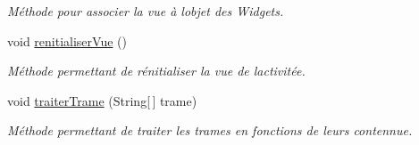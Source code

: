 \begin{DoxyCompactItemize}
\begin{DoxyCompactList}\small\item\em Méthode pour associer la vue à l\textquotesingle{}objet des Widgets. \end{DoxyCompactList}\item 
void \hyperlink{classcom_1_1lasalle_1_1io__trucks_1_1_main_activity_ac4c0bdaf761a42e924c6cf9d1b9a0e23}{renitialiser\+Vue} ()
\begin{DoxyCompactList}\small\item\em Méthode permettant de rénitialiser la vue de l\textquotesingle{}activitée. \end{DoxyCompactList}\item 
void \hyperlink{classcom_1_1lasalle_1_1io__trucks_1_1_main_activity_a2088afcfce1e8adcf35fe6b79d63887a}{traiter\+Trame} (String\mbox{[}$\,$\mbox{]} trame)
\begin{DoxyCompactList}\small\item\em Méthode permettant de traiter les trames en fonctions de leurs contennue. \end{DoxyCompactList}\end{DoxyCompactItemize}
